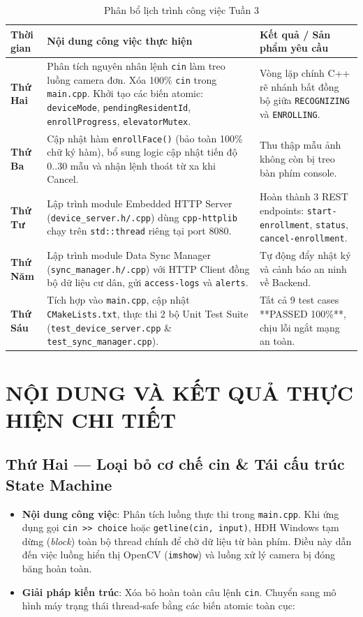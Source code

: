 \documentclass[12pt,a4paper]{article}
\begin{document}
\begin{table}[H]
\centering
\small
\begin{tabularx}{\textwidth}{|l|X|X|}
\hline
\textbf{Thời gian} & \textbf{Nội dung công việc thực hiện} & \textbf{Kết quả / Sản phẩm yêu cầu} \\ \hline
\textbf{Thứ Hai} & Phân tích nguyên nhân lệnh \texttt{cin} làm treo luồng camera đơn. Xóa 100\% \texttt{cin} trong \texttt{main.cpp}. Khởi tạo các biến atomic: \texttt{deviceMode}, \texttt{pendingResidentId}, \texttt{enrollProgress}, \texttt{elevatorMutex}. & Vòng lặp chính C++ rẽ nhánh bất đồng bộ giữa \texttt{RECOGNIZING} và \texttt{ENROLLING}. \\ \hline
\textbf{Thứ Ba} & Cập nhật hàm \texttt{enrollFace()} (bảo toàn 100\% chữ ký hàm), bổ sung logic cập nhật tiến độ 0..30 mẫu và nhận lệnh thoát từ xa khi Cancel. & Thu thập mẫu ảnh không còn bị treo bàn phím console. \\ \hline
\textbf{Thứ Tư} & Lập trình module Embedded HTTP Server (\texttt{device\_server.h/.cpp}) dùng \texttt{cpp-httplib} chạy trên \texttt{std::thread} riêng tại port 8080. & Hoàn thành 3 REST endpoints: \texttt{start-enrollment}, \texttt{status}, \texttt{cancel-enrollment}. \\ \hline
\textbf{Thứ Năm} & Lập trình module Data Sync Manager (\texttt{sync\_manager.h/.cpp}) với HTTP Client đồng bộ dữ liệu cư dân, gửi \texttt{access-logs} và \texttt{alerts}. & Tự động đẩy nhật ký và cảnh báo an ninh về Backend. \\ \hline
\textbf{Thứ Sáu} & Tích hợp vào \texttt{main.cpp}, cập nhật \texttt{CMakeLists.txt}, thực thi 2 bộ Unit Test Suite (\texttt{test\_device\_server.cpp} \& \texttt{test\_sync\_manager.cpp}). & Tất cả 9 test cases **PASSED 100\%**, chịu lỗi ngắt mạng an toàn. \\ \hline
\end{tabularx}
\caption{Phân bổ lịch trình công việc Tuần 3}
\end{table}

\newpage

\section{NỘI DUNG VÀ KẾT QUẢ THỰC HIỆN CHI TIẾT}

\subsection{Thứ Hai — Loại bỏ cơ chế cin \& Tái cấu trúc State Machine}
\begin{itemize}
    \item \textbf{Nội dung công việc}: Phân tích luồng thực thi trong \texttt{main.cpp}. Khi ứng dụng gọi \texttt{cin >> choice} hoặc \texttt{getline(cin, input)}, HĐH Windows tạm dừng (\textit{block}) toàn bộ thread chính để chờ dữ liệu từ bàn phím. Điều này dẫn đến việc luồng hiển thị OpenCV (\texttt{imshow}) và luồng xử lý camera bị đóng băng hoàn toàn.
    \item \textbf{Giải pháp kiến trúc}: Xóa bỏ hoàn toàn câu lệnh \texttt{cin}. Chuyển sang mô hình máy trạng thái thread-safe bằng các biến atomic toàn cục:
\end{itemize}
\end{document}
